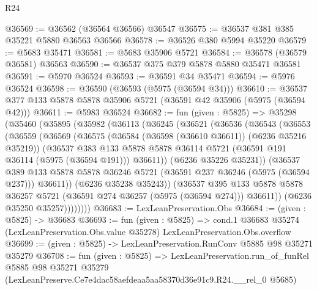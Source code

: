 \begin{lexlean}{R24}
\begin{coremodule}
@36569 := @36562 (@36564 @36566) @36547
@36575 := @36537 @381 @385 @35221 @5880 @36563 @36566
@36578 := @36526 @380 @5994 @35220
@36579 := @5683 @35471
@36581 := @5683 @35906 @5721
@36584 := @36578 (@36579 @36581) @36563
@36590 := @36537 @375 @379 @5878 @5880 @35471 @36581
@36591 := @5970 @36524
@36593 := @36591 @34 @35471
@36594 := @5976 @36524
@36598 := @36590 (@36593 (@5975 (@36594 @34)))
@36610 := @36537 @377 @133 @5878 @5878 @35906 @5721 (@36591 @42 @35906 (@5975 (@36594 @42)))
@36611 := @5983 @36524
@36682 := fun (given : @5825) =>
  @35298
    (@35460
      (@35895
        (@35982
          (@36113
            (@36245
              (@36521
                (@36536
                  (@36543
                    (@36553
                      (@36559
                        (@36569
                          (@36575
                            (@36584 (@36598 (@36610 @36611)) (@6236 @35216 @35219))
                            (@36537
                              @383
                              @133
                              @5878
                              @5878
                              @36114
                              @5721
                              (@36591 @191 @36114 (@5975 (@36594 @191)))
                              @36611))
                          (@6236 @35226 @35231))
                        (@36537
                          @389
                          @133
                          @5878
                          @5878
                          @36246
                          @5721
                          (@36591 @237 @36246 (@5975 (@36594 @237)))
                          @36611))
                      (@6236 @35238 @35243))
                    (@36537
                      @395
                      @133
                      @5878
                      @5878
                      @36257
                      @5721
                      (@36591 @274 @36257 (@5975 (@36594 @274)))
                      @36611))
                  (@6236 @35250 @35257))))))))
@36683 := LexLeanPreservation.Obs
@36684 := (given : @5825) -> @36683
@36693 := fun (given : @5825) =>
  cond.{1} @36683 @35274 (LexLeanPreservation.Obs.value @35278) LexLeanPreservation.Obs.overflow
@36699 := (given : @5825) -> LexLeanPreservation.RunConv @5885 @98 @35271 @35279
@36708 := fun (given : @5825) =>
  LexLeanPreservation.run_of_funRel
    @5885
    @98
    @35271
    @35279
    (LexLeanPreserve.Ce7e4dac58aefdeaa5aa58370d36e91c9.R24.__rel_0 @5685)
\end{coremodule}
\end{lexlean}
